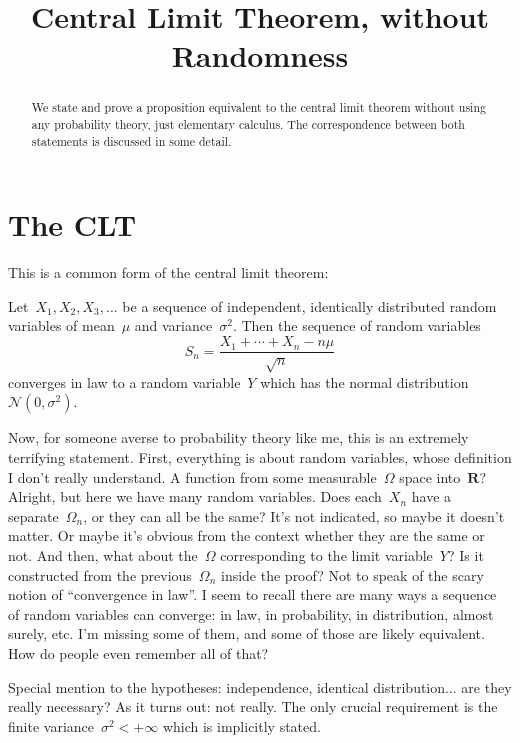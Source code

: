 \title{Central Limit Theorem, without Randomness}

\begin{abstract}
	We state and prove a proposition equivalent to the central
	limit theorem without using any probability theory, just
	elementary calculus.  The correspondence between both
	statements is discussed in some detail.
\end{abstract}

\newcommand{\R}{\mathbf{R}}
\newcommand{\Z}{\mathbf{Z}}

\bigskip

\section{The CLT}

This is a common form of the central limit theorem:

\begin{theorem}
	Let~$X_1, X_2, X_3,\ldots$ be a sequence of independent,
	identically distributed random variables of mean~$\mu$ and
	variance~$\sigma^2$.  Then the sequence of random variables
	\[
		S_n = \frac{X_1+\cdots+X_n-n\mu}{\sqrt{n}}
	\]
	converges in law to a random variable~$Y$ which has the
	normal distribution~$\mathcal{N}\left(0,\sigma^2\right)$.
\end{theorem}

Now, for someone averse to probability theory like me, this is an
extremely terrifying statement.  First, everything is about random
variables, whose definition I don't really understand.  A function from
some measurable~$\Omega$ space into~$\R$?  Alright, but here we have
many random variables.  Does each~$X_n$ have a separate~$\Omega_n$,
or they can all be the same?  It's not indicated, so maybe it doesn't
matter.  Or maybe it's obvious from the context whether they are the
same or not.  And then, what about the~$\Omega$ corresponding to the limit
variable~$Y$?  Is it constructed from the previous~$\Omega_n$ inside
the proof?  Not to speak of the scary notion of ``convergence in
law''.  I seem to recall there are many ways a sequence of random
variables can converge: in law, in probability, in distribution,
almost surely, etc.  I'm missing some of them, and some of
those are likely equivalent.  How do people even remember all of
that?

Special mention to the hypotheses: independence, identical
distribution... are they really necessary?  As it turns out: not
really.  The only crucial requirement is the finite
variance~$\sigma^2<+\infty$ which is implicitly stated.

